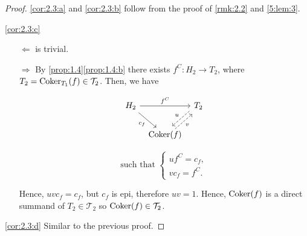 \begin{proof}
  \ref{cor:2.3:a} and \ref{cor:2.3:b} follow from the proof of \ref{rmk:2.2}
  and \ref{5:lem:3}.

  \ref{cor:2.3:c}
  \begin{enumerate}
    \item[$\Leftarrow$] is trivial.
    \item[$\Rightarrow$] By \ref{prop:1.4}\ref{prop:1.4:b} there exists $f^C:H_2\to T_2$, where
      $T_2=\operatorname{Coker}_{T_1}(f)\in\mathcal{T}_2$. Then, we have

      \begin{minipage}[b]{0.45\linewidth}
        \begin{equation*}
          \begin{tikzcd}[column sep=tiny]
            H_2\arrow{rr}{f^C}\arrow{dr}[']{c_f}
              & & T_2 \arrow[dashed, shift right]{ld}[']{u}\\
              & \Coker(f)\arrow[dashed, shift right]{ur}[']{v}
          \end{tikzcd}
        \end{equation*}
      \end{minipage}
      \begin{minipage}[b]{0.45\linewidth}
        \begin{equation*}
          \text{such that }
          \left\{
          \begin{array}{c}
            uf^C = c_f,\\
            vc_f = f^C.
          \end{array}
          \right.
        \end{equation*}
      \end{minipage}

      Hence, $uvc_f=c_f$, but $c_f$ is epi, therefore $uv=1$. Hence, $\operatorname{Coker}(f)$ is a direct
      summand of $T_2\in\mathcal{T}_2$ so $\operatorname{Coker}(f)\in\mathcal{T}_2$.
  \end{enumerate}

  \ref{cor:2.3:d} Similar to the previous proof.
\end{proof}

